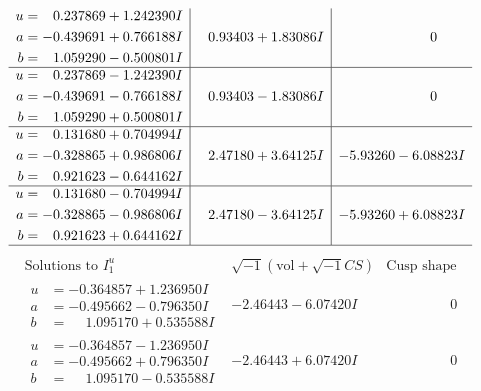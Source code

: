 \documentclass[1p]{elsarticle_modified}
\theoremstyle{definition}
\newcommand{\I}{\sqrt{-1}}
\begin{document}
$$\begin{array}{c|c|c}
\begin{aligned}
u &= \phantom{-}0.237869 + 1.242390 I \\
a &= -0.439691 + 0.766188 I \\
b &= \phantom{-}1.059290 - 0.500801 I\end{aligned}
 & \phantom{-}0.93403 + 1.83086 I & \phantom{-0.000000 } 0 \\ \hline\begin{aligned}
u &= \phantom{-}0.237869 - 1.242390 I \\
a &= -0.439691 - 0.766188 I \\
b &= \phantom{-}1.059290 + 0.500801 I\end{aligned}
 & \phantom{-}0.93403 - 1.83086 I & \phantom{-0.000000 } 0 \\ \hline\begin{aligned}
u &= \phantom{-}0.131680 + 0.704994 I \\
a &= -0.328865 + 0.986806 I \\
b &= \phantom{-}0.921623 - 0.644162 I\end{aligned}
 & \phantom{-}2.47180 + 3.64125 I & -5.93260 - 6.08823 I \\ \hline\begin{aligned}
u &= \phantom{-}0.131680 - 0.704994 I \\
a &= -0.328865 - 0.986806 I \\
b &= \phantom{-}0.921623 + 0.644162 I\end{aligned}
 & \phantom{-}2.47180 - 3.64125 I & -5.93260 + 6.08823 I\\
 \hline 
 \end{array}$$\newpage$$\begin{array}{c|c|c}  
\text{Solutions to }I^u_{1}& \I (\text{vol} + \sqrt{-1}CS) & \text{Cusp shape}\\
 \hline 
\begin{aligned}
u &= -0.364857 + 1.236950 I \\
a &= -0.495662 - 0.796350 I \\
b &= \phantom{-}1.095170 + 0.535588 I\end{aligned}
 & -2.46443 - 6.07420 I & \phantom{-0.000000 } 0 \\ \hline\begin{aligned}
u &= -0.364857 - 1.236950 I \\
a &= -0.495662 + 0.796350 I \\
b &= \phantom{-}1.095170 - 0.535588 I\end{aligned}
 & -2.46443 + 6.07420 I & \phantom{-0.000000 } 0 \\ \hline\begin{aligned}

\end{aligned}
\end{array}$$
\end{document}
